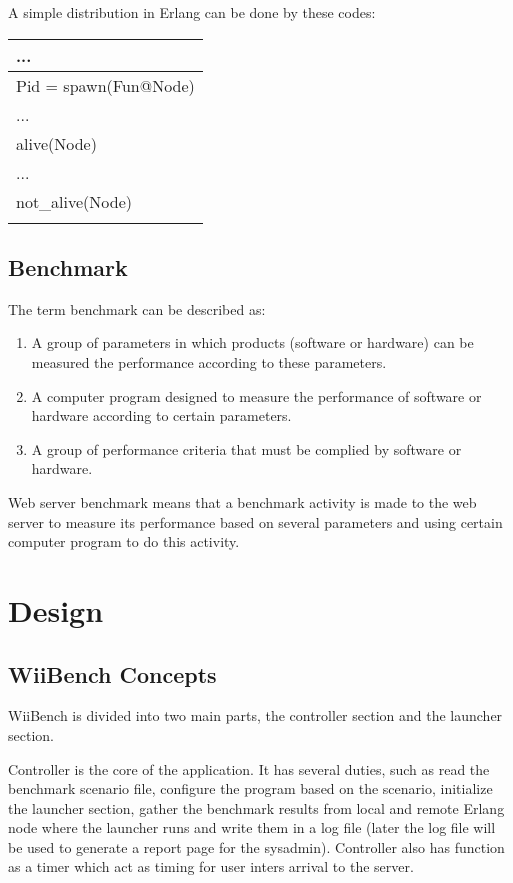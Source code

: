 \documentclass[final,
notitlepage,
narroweqnarray,
    inline,
    twoside,
]{ieee}
\begin{document}
A simple distribution in Erlang can be done by these codes:

\begin{tabular}{|p{1.2in}|} \hline
...  \\ \hline
Pid = spawn(Fun@Node)  \\ \hline
...  \\ \hline
alive(Node)  \\ \hline
...  \\ \hline
not\_alive(Node)  \\ \hline
 \\ \hline
\end{tabular}

\subsection{Benchmark}

The term benchmark can be described as:

\begin{enumerate}
\item A group of parameters in which products (software or
hardware) can be measured the performance according to these
parameters.

\item A computer program designed to measure the performance of
software or hardware according to certain parameters.

\item A group of performance criteria that must be complied by
software or hardware.
\end{enumerate}


Web server benchmark means that a benchmark activity is made to
the web server to measure its performance based on several
parameters and using certain computer program to do this activity.

\section{Design}

\subsection{WiiBench Concepts}

WiiBench is divided into two main parts, the controller section
and the launcher section.

Controller is the core of the application. It has several duties,
such as read the benchmark scenario file, configure the program
based on the scenario, initialize the launcher section, gather the
benchmark results from local and remote Erlang node where the
launcher runs and write them in a log file (later the log file
will be used to generate a report page for the sysadmin).
Controller also has function as a timer which act as timing for
user inters arrival to the server.
\end{document}
